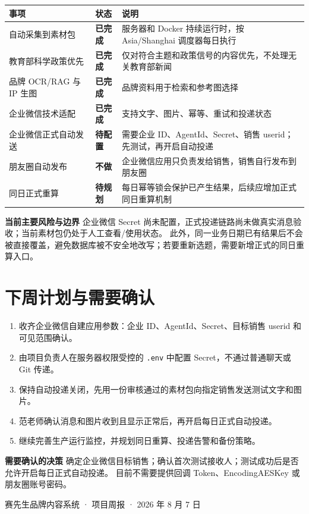 \documentclass[UTF8,11pt,a4paper,fontset=none]{ctexart}
\begin{document}
\begin{tabularx}{\textwidth}{L{4.1cm}L{2.2cm}Y}
\toprule
{}
\color{white}\bfseries\sffamily 事项 &
\color{white}\bfseries\sffamily 状态 &
\color{white}\bfseries\sffamily 说明 \\
\midrule
自动采集到素材包 & \textbf{\color{teal}已完成} & 服务器和 Docker 持续运行时，按 Asia/Shanghai 调度器每日执行 \\
教育部科学政策优先 & \textbf{\color{teal}已完成} & 仅对符合主题和政策信号的内容优先，不处理无关教育部新闻 \\
品牌 OCR/RAG 与 IP 生图 & \textbf{\color{teal}已完成} & 品牌资料用于检索和参考图选择 \\
企业微信技术适配 & \textbf{\color{teal}已完成} & 支持文字、图片、幂等、重试和投递状态 \\
企业微信正式自动发送 & \textbf{\color{amber}待配置} & 需要企业 ID、AgentId、Secret、销售 userid；先测试，再开启自动投递 \\
朋友圈自动发布 & \textbf{\color{slate}不做} & 企业微信应用只负责发给销售，销售自行发布到朋友圈 \\
同日正式重算 & \textbf{\color{amber}待规划} & 每日幂等锁会保护已产生结果，后续应增加正式同日重算机制 \\
\bottomrule
\end{tabularx}

\begin{riskbox}
\textbf{\sffamily\color{red}当前主要风险与边界}\quad
企业微信 Secret 尚未配置，正式投递链路尚未做真实消息验收；当前素材包仍处于人工查看/使用状态。
此外，同一业务日期已有结果后不会被直接覆盖，避免数据库被不安全地改写；若要重新选题，需要新增正式的同日重算入口。
\end{riskbox}

\section{下周计划与需要确认}

\begin{enumerate}[leftmargin=2em,itemsep=0.28em]
  \item 收齐企业微信自建应用参数：企业 ID、AgentId、Secret、目标销售 userid 和可见范围确认。
  \item 由项目负责人在服务器权限受控的 \texttt{.env} 中配置 Secret，不通过普通聊天或 Git 传递。
  \item 保持自动投递关闭，先用一份审核通过的素材包向指定销售发送测试文字和图片。
  \item 范老师确认消息和图片收到且显示正常后，再开启每日正式自动投递。
  \item 继续完善生产运行监控，并规划同日重算、投递告警和备份策略。
\end{enumerate}

\begin{focusbox}
\textbf{\sffamily\color{navy}需要确认的决策}\quad
确定企业微信目标销售；确认首次测试接收人；测试成功后是否允许开启每日正式自动投递。
目前不需要提供回调 Token、EncodingAESKey 或朋友圈账号密码。
\end{focusbox}

\vfill
\begin{center}
\small\sffamily\color{muted}
赛先生品牌内容系统 · 项目周报 · 2026 年 8 月 7 日
\end{center}
\end{document}
